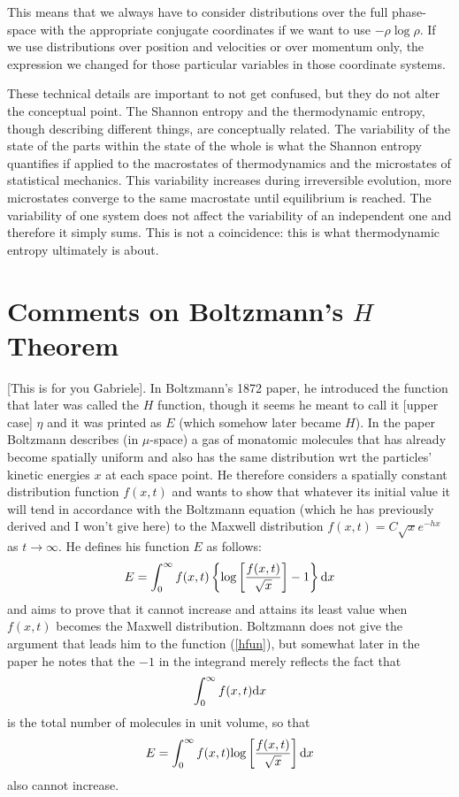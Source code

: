 \documentclass{article}
\begin{document}
This means that we always have to consider distributions over the full phase-space with the appropriate conjugate coordinates if we want to use $-\rho \log \rho$. If we use distributions over position and velocities or over momentum only, the expression we changed for those particular variables in those coordinate systems.

These technical details are important to not get confused, but they do not alter the conceptual point. The Shannon entropy and the thermodynamic entropy, though describing different things, are conceptually related. The variability of the state of the parts within the state of the whole is what the Shannon entropy quantifies if applied to the macrostates of thermodynamics and the microstates of statistical mechanics. This variability increases during irreversible evolution, more microstates converge to the same macrostate until equilibrium is reached. The variability of one system does not affect the variability of an independent one and therefore it simply sums. This is not a coincidence: this is what thermodynamic entropy ultimately is about.

\section{Comments on Boltzmann's $H$ Theorem}

[This is for you Gabriele]. In Boltzmann's 1872 paper, he introduced the function that later was called the $H$ function, though it seems he meant to call it [upper case] $\eta$ and it was printed as $E$ (which somehow later became $H$). In the paper Boltzmann describes (in $\mu$-space) a gas of monatomic molecules that has already become spatially uniform and also has the same distribution wrt the particles' kinetic energies $x$ at each space point. He therefore considers a spatially constant distribution function $f(x,t)$ and wants to show that whatever its initial value it will tend in accordance with the Boltzmann equation (which he has previously derived and I won't give here) to the Maxwell distribution $f(x,t)=C\sqrt xe^{-hx}$ as $t\rightarrow\infty$. He defines his function $E$ as follows:
\begin{equation}
E=\int_0^\infty f(x,t)\left\{\textrm{log}\left [{f(x,t)\over \sqrt x}\right ]-1\right\}\textrm dx\label{hfun}
\end{equation}
and aims to prove that it cannot increase and attains its least value when $f(x,t)$ becomes the Maxwell distribution. Boltzmann does not give the argument that leads him to the function (\ref{hfun}), but somewhat later in the paper he notes that the $-1$ in the integrand merely reflects the fact that
$$
\int_0^\infty f(x,t)\textrm dx
$$
is the total number of molecules in unit volume, so that 
\begin{equation}
E=\int_0^\infty f(x,t)\textrm{log}\left [{f(x,t)\over \sqrt x}\right ]\textrm dx\label{hfunb}
\end{equation}
also cannot increase.
\end{document}
